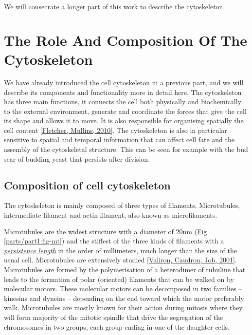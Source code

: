 \documentclass[A4paperpaper,11pt,english]{sphinxmanual}
\begin{document}
We will consecrate a longer part of this work to describe the cytoskeleton.


\section{The Role And Composition Of The Cytoskeleton}
\label{parts/part1:the-role-and-composition-of-the-cytoskeleton}\label{parts/part1:role-of-actin}
We have already introduced the cell cytoskeleton in a previous part, and we will
describe its components and functionality more in detail here.  The cytoskeleton
has three main functions, it connects the cell both physically
and biochemically to the external environment, generate and coordinate the
forces that give the cell its shape and allows it to move. It is also
responsible for organising spatially  the cell content {\hyperref[parts/part1:fletcher2010]{{[}Fletcher, Mullins,  2010{]}}}.
The cytoskeleton is also in particular sensitive to spatial and temporal
information that can affect cell fate and the assembly of the cytoskeletal
structure. This can be seen for example with the bud scar of budding yeast that
persists after division.


\subsection{Composition of cell cytoskeleton}
\label{parts/part1:composition-of-cell-cytoskeleton}
The cytoskeleton is mainly composed of three types of filaments.
Microtubules, intermediate filament and actin filament, also known as
microfilaments.

Microtubules are the widest structure with a diameter of 20nm (\hyperref[parts/part1:fig-mt]{Fig  \ref*{parts/part1:fig-mt}})
and the
stiffest of the three kinds of filaments with a {\hyperref[parts/part1:viscoelastic]{\emph{persistence length}}} in the order
of millimeters, much longer than the size of the usual cell.
Microtubules are extensively studied {\hyperref[parts/part1:valiron2001]{{[}Valiron, Caudron, Job,  2001{]}}}.
Microtubules are formed by the polymerisation of a heterodimer of tubuline
that leads to the formation of polar (oriented) filaments that can be walked on
by molecular motors. These molecular motors can be decomposed in two families –
kinesins and dyneins – depending on the end toward which the motor preferably
walk.  Microtubules are mostly known for their action during mitosis
where they will form majority of the mitotic spindle that drive the segregation
of the chromosomes in two groups, each group ending in one of the daughter
cells.
\end{document}
